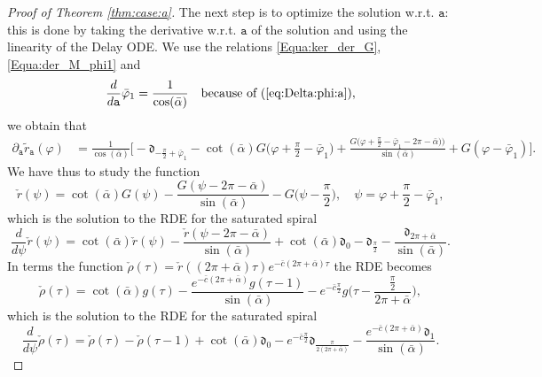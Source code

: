 \documentclass[reqno]{amsart}
\theoremstyle{definition} \newtheorem{definition}{Definition}[section]
\theoremstyle{definition} \newtheorem{remark}[definition]{Remark}
\theoremstyle{plain} \newtheorem{lemma}[definition]{Lemma}
\theoremstyle{plain} \newtheorem{proposition}[definition]{Proposition}
\theoremstyle{plain} \newtheorem{theorem}[definition]{Theorem}
\theoremstyle{plain} \newtheorem{corollary}[definition]{Corollary}
\theoremstyle{definition} \newtheorem{example}[definition]{Example}
\theoremstyle{plain} \newtheorem{claim}[clai]{Claim}
\theoremstyle{definition} \newtheorem{assumption}[definition]{Assumption}
\theoremstyle{definition} \newtheorem{observation}[definition]{Observation}
\newcommand{\1}{\mathbbm 1}
\newcommand{\Diracd}{\mathfrak{d}}
\numberwithin{equation}{section} %
\theoremstyle{plain} \newtheorem*{theorem*}{Theorem}
\theoremstyle{plain} \newtheorem{mthm}[maintheorem]{Main Theorem}
\theoremstyle{plain} \newtheorem*{mthm*}{Main Theorem}
\theoremstyle{plain} \newtheorem*{conjecture*}{Conjecture}
\theoremstyle{plain} \newtheorem{conjecture}[definition]{Conjecture}
\theoremstyle{plain} \newtheorem*{problem*}{Problem}
\begin{document}
\begin{proof}[Proof of Theorem \ref{thm:case:a}]
The next step is to optimize the solution w.r.t. $\mathtt a$: this is done by taking the derivative w.r.t. $\mathtt a$ of the solution and using the linearity of the Delay ODE. We use the relations \eqref{Equa:ker_der_G}, \eqref{Equa:der_M_phi1} and
\begin{equation*}
\frac{d}{d\mathtt a} \bar \varphi_1 = \frac{1}{\cos(\bar \alpha)} \quad \text{because of (\ref{eq:Delta:phi:a})},
\end{equation*}
we obtain that
\begin{align*}
\partial_{\mathtt a} \tilde r_{\mathtt a}(\varphi) &= \frac{1}{\cos(\bar \alpha)} \bigg[ - \Diracd_{- \frac{\pi}{2} + \bar \varphi_1} - \cot(\bar \alpha) G \bigg( \varphi + \frac{\pi}{2} - \bar \varphi_1 \bigg) + \frac{G \big( \varphi + \frac{\pi}{2} - \bar \varphi_1 - 2\pi - \bar \alpha) \big)}{\sin(\bar \alpha)} + G(\varphi - \bar \varphi_1) \bigg].
\end{align*}
We have thus to study the function
\begin{equation*}
\check r(\psi) = \cot(\bar \alpha) G(\psi) - \frac{G(\psi - 2\pi - \bar \alpha)}{\sin(\bar \alpha)} - G \bigg( \psi - \frac{\pi}{2} \bigg), \quad \psi = \varphi + \frac{\pi}{2} - \bar \varphi_1,
\end{equation*}
which is the solution to the RDE for the saturated spiral
\begin{equation*}
\frac{d}{d\psi} \check r(\psi) = \cot(\bar \alpha) \check r(\psi) - \frac{\check r(\psi- 2\pi - \bar \alpha)}{\sin(\bar \alpha)} + \cot(\bar \alpha) \Diracd_0 - \Diracd_{\frac{\pi}{2}} - \frac{\Diracd_{2\pi + \bar \alpha}}{\sin(\bar \alpha)}. 
\end{equation*}
In terms the function $\check \rho(\tau) = \check r((2\pi+\bar \alpha) \tau) e^{- \bar c (2\pi + \bar \alpha) \tau}$ the RDE becomes
\begin{equation}
\label{Equa:ckrho_delph_casest}
\check \rho(\tau) = \cot(\bar \alpha) g(\tau) - \frac{e^{-\bar c (2\pi + \bar \alpha)} g(\tau - 1)}{\sin(\bar \alpha)} - e^{-\bar c \frac{\pi}{2}} g \bigg( \tau - \frac{\frac{\pi}{2}}{2\pi + \bar \alpha} \bigg),
\end{equation}
which is the solution to the RDE for the saturated spiral
\begin{equation*}
\frac{d}{d\psi} \check \rho(\tau) = \check \rho(\tau) - \check \rho(\tau-1) + \cot(\bar \alpha) \Diracd_0 - e^{-\bar c \frac{\pi}{2}} \Diracd_{\frac{\pi}{2(2\pi+\bar \alpha)}} - \frac{e^{-\bar c(2\pi+\bar \alpha)} \Diracd_{1}}{\sin(\bar \alpha)}. 
\end{equation*}


\end{proof}
\end{document}
